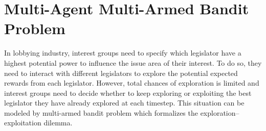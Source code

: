 \documentclass{article}
\begin{document}









\section{Multi-Agent Multi-Armed Bandit Problem}

In lobbying industry, interest groups 
need to specify which legislator
have a highest potential power to influence the issue area of their interest.
To do so, 
they need to interact with different legislators 
to explore the potential expected rewards from each legislator.
However, total chances of exploration is limited 
and interest groups 
need to decide 
whether to 
keep exploring or 
exploiting the best legislator they have already explored at each timestep.
This situation can be modeled by multi-armed bandit problem
which formalizes the exploration–exploitation dilemma.
\end{document}
